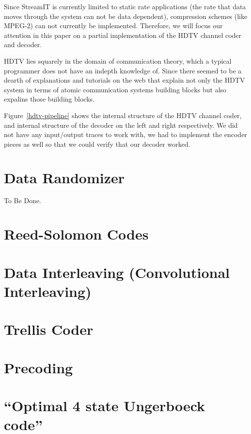 \documentclass{article}
\begin{document}
Since StreamIT is currently limited to static rate applications (the rate that data 
moves through the system can not be data dependent), compression schemes (like MPEG-2)
can not currently be implemented. Therefore, we will focus our attention in this paper on
a partial implementation of the HDTV channel coder and decoder. 

HDTV lies squarely in the domain of communication theory, which a typical programmer does
not have an indepth knowledge of. Since there seemed to be a dearth of explanations and tutorials
on the web that explain not only the HDTV system in terms of atomic communication systems
building blocks but also expalins those building blocks. 

Figure~\ref{hdtv-pipeline} shows the internal structure of the HDTV channel coder, and 
internal structure of the decoder on the left and right respectively. We did not 
have any input/output traces to work with, we had to implement the encoder pieces as well so 
that we could verify that our decoder worked. 

\section{Data Randomizer}
To Be Done.


\section{Reed-Solomon Codes}



\section{Data Interleaving (Convolutional Interleaving)}


\section{Trellis Coder}


\section{Precoding}


\section{``Optimal 4 state Ungerboeck code''}

\end{document}
